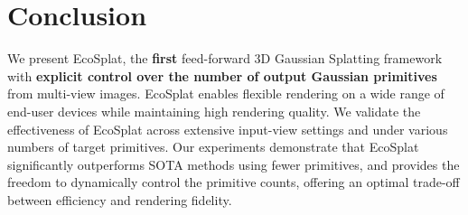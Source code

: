 \section{Conclusion}
We present {EcoSplat}, the \textbf{first} feed-forward 3D Gaussian Splatting framework with \textbf{explicit control over the number of output Gaussian primitives} from multi-view images. EcoSplat enables flexible rendering on a wide range of end-user devices while maintaining high rendering quality. We validate the effectiveness of EcoSplat across extensive input-view settings and under various numbers of target primitives. Our experiments demonstrate that EcoSplat significantly outperforms SOTA methods using fewer primitives, and provides the freedom to dynamically control the primitive counts, offering an optimal trade-off between efficiency and rendering fidelity.

